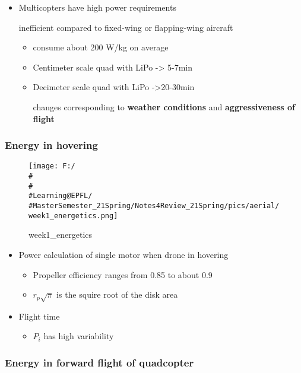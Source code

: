 \documentclass[]{article}
\begin{document}
\begin{itemize}
\item
  Multicopters have high power requirements

  inefficient compared to fixed-wing or flapping-wing aircraft

  \begin{itemize}
  \item
    consume about 200 W/kg on average
  \item
    Centimeter scale quad with LiPo -\textgreater{} 5-7min
  \item
    Decimeter scale quad with LiPo -\textgreater{}20-30min

    changes corresponding to \textbf{weather conditions} and
    \textbf{aggressiveness of flight}
  \end{itemize}
\end{itemize}

\subsubsection{Energy in hovering}\label{header-n377}

\begin{figure}
\centering
\texttt{[image: F:/\\\#\\\#\\\#Learning@EPFL/\\\#MasterSemester\_21Spring/Notes4Review\_21Spring/pics/aerial/week1\_energetics.png]}
\caption{week1\_energetics}
\end{figure}

\begin{itemize}
\item
  Power calculation of single motor when drone in hovering

  \begin{itemize}
  \item
    Propeller efficiency ranges from 0.85 to about 0.9
  \item
    \(r_p \sqrt{\pi}\) is the squire root of the disk area
  \end{itemize}
\item
  Flight time

  \begin{itemize}
  \item
    \(P_i\) has high variability
  \end{itemize}
\end{itemize}

\subsubsection{Energy in forward flight of
quadcopter}\label{header-n392}
\end{document}
